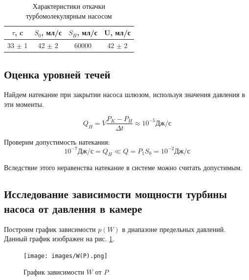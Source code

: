 \documentclass[a4paper, 12pt]{article}
\begin{document}
            \begin{table}[H]   
                \centering
                \begin{tabular}{|c|c|c|c|}
                    \hline 
                    $\tau$, c & $S_0$, мл/с& $S_H$, мл/с& U, мл/с  \\ 
                    \hline 
                    33 $\pm$ 1 & 42 $\pm$ 2 & 60000 & 42 $\pm$ 2\\ 
                    \hline  
                \end{tabular} 
                \caption{Характеристики откачки турбомолекулярным насосом}
            \end{table}

        \subsection*{Оценка уровней течей}
        Найдем натекание при закрытии насоса шлюзом, используя значения давления в эти моменты.
        
        \begin{equation}
            Q_H = V\frac{P_K-P_H}{\Delta t} \approx 10^{-5} \text{Дж/с}
        \end{equation}
        
        Проверим допустимость натекания:
        \begin{equation}
            10^{-7} \text{Дж/с} = Q_H \ll Q = P_1 S_0 = 10^{-2} \text{Дж/с}
        \end{equation}
        
        Вследствие этого неравенства натекание в системе можно считать допустимым.

        \subsection*{Исследование зависимости мощности турбины насоса от давления в камере}

        Построим график зависимости $p(W)$ в диапазоне предельных давлений. Данный график изображен на рис. \ref{fig:Depence_preasure_of_power}.
        
        \begin{figure}[H]
            \begin{center}
            \texttt{[image: images/W(P).png]}
            \caption{График зависимости $W$ от $P$}
            \label{fig:Depence_preasure_of_power}
            \end{center}
        \end{figure}
        
\end{document}

